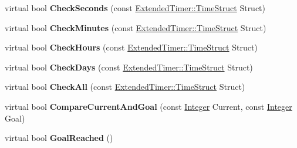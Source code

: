 \begin{DoxyCompactItemize}
\item 
\hypertarget{classphys_1_1ExtendedTimer_a2a2d9aa7baacdd86f0007510e8808db9}{
virtual bool {\bfseries CheckSeconds} (const \hyperlink{classphys_1_1ExtendedTimer_a0f316e9347d1c118a157cc3c737c554b}{ExtendedTimer::TimeStruct} Struct)}
\label{dc/d7c/classphys_1_1ExtendedTimer_a2a2d9aa7baacdd86f0007510e8808db9}

\item 
\hypertarget{classphys_1_1ExtendedTimer_a14ed25abe8070ba5e016e9c45c6974d6}{
virtual bool {\bfseries CheckMinutes} (const \hyperlink{classphys_1_1ExtendedTimer_a0f316e9347d1c118a157cc3c737c554b}{ExtendedTimer::TimeStruct} Struct)}
\label{dc/d7c/classphys_1_1ExtendedTimer_a14ed25abe8070ba5e016e9c45c6974d6}

\item 
\hypertarget{classphys_1_1ExtendedTimer_aee17ef0ce61f2d587ff6734ca54a5747}{
virtual bool {\bfseries CheckHours} (const \hyperlink{classphys_1_1ExtendedTimer_a0f316e9347d1c118a157cc3c737c554b}{ExtendedTimer::TimeStruct} Struct)}
\label{dc/d7c/classphys_1_1ExtendedTimer_aee17ef0ce61f2d587ff6734ca54a5747}

\item 
\hypertarget{classphys_1_1ExtendedTimer_a9782d2866e39777ebfa2193460a1c457}{
virtual bool {\bfseries CheckDays} (const \hyperlink{classphys_1_1ExtendedTimer_a0f316e9347d1c118a157cc3c737c554b}{ExtendedTimer::TimeStruct} Struct)}
\label{dc/d7c/classphys_1_1ExtendedTimer_a9782d2866e39777ebfa2193460a1c457}

\item 
\hypertarget{classphys_1_1ExtendedTimer_af92fcaca7cea1a2d48f7411b1b18223f}{
virtual bool {\bfseries CheckAll} (const \hyperlink{classphys_1_1ExtendedTimer_a0f316e9347d1c118a157cc3c737c554b}{ExtendedTimer::TimeStruct} Struct)}
\label{dc/d7c/classphys_1_1ExtendedTimer_af92fcaca7cea1a2d48f7411b1b18223f}

\item 
\hypertarget{classphys_1_1ExtendedTimer_ae71b57d5a274f77edb37a9606eaa02bb}{
virtual bool {\bfseries CompareCurrentAndGoal} (const \hyperlink{namespacephys_a7f09bf5585b2bb97613cd9aad4273a81}{Integer} Current, const \hyperlink{namespacephys_a7f09bf5585b2bb97613cd9aad4273a81}{Integer} Goal)}
\label{dc/d7c/classphys_1_1ExtendedTimer_ae71b57d5a274f77edb37a9606eaa02bb}

\item 
\hypertarget{classphys_1_1ExtendedTimer_ae3684bd4b2638617e86df3cb78813ce6}{
virtual bool {\bfseries GoalReached} ()}
\label{dc/d7c/classphys_1_1ExtendedTimer_ae3684bd4b2638617e86df3cb78813ce6}

\end{DoxyCompactItemize}

